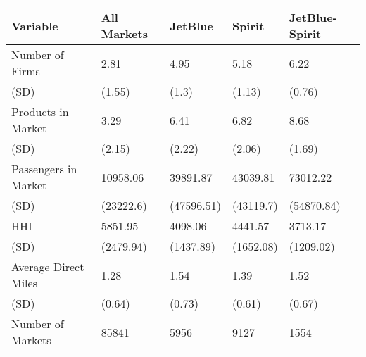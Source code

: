 
\begin{tabular}[t]{lllll}
\toprule
Variable & All Markets & JetBlue & Spirit & JetBlue-Spirit\\
\midrule
Number of Firms & 2.81 & 4.95 & 5.18 & 6.22\\
(SD) & (1.55) & (1.3) & (1.13) & (0.76)\\
Products in Market & 3.29 & 6.41 & 6.82 & 8.68\\
(SD) & (2.15) & (2.22) & (2.06) & (1.69)\\
Passengers in Market & 10958.06 & 39891.87 & 43039.81 & 73012.22\\
(SD) & (23222.6) & (47596.51) & (43119.7) & (54870.84)\\
HHI & 5851.95 & 4098.06 & 4441.57 & 3713.17\\
(SD) & (2479.94) & (1437.89) & (1652.08) & (1209.02)\\
Average Direct Miles & 1.28 & 1.54 & 1.39 & 1.52\\
(SD) & (0.64) & (0.73) & (0.61) & (0.67)\\
\midrule
Number of Markets & 85841 & 5956 & 9127 & 1554\\
\bottomrule
\end{tabular}
